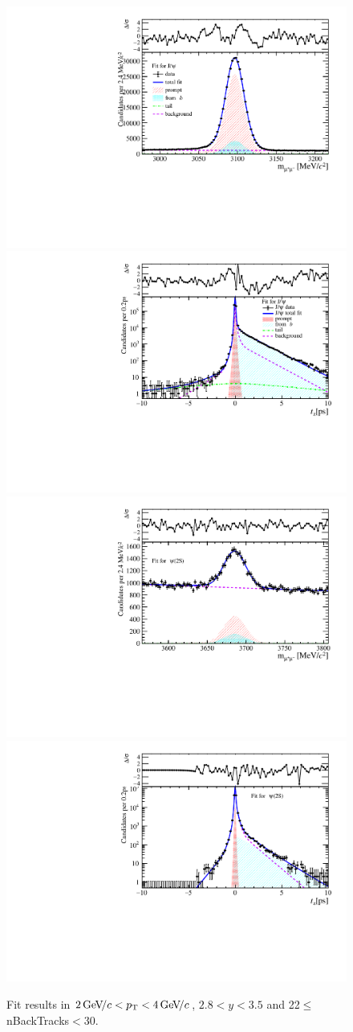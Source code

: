 \begin{figure}[H]
\begin{center}
\includegraphics[width=0.47\linewidth]{pdf/Jpsi/drawmassB/n4y2pt2.pdf}
\includegraphics[width=0.47\linewidth]{pdf/Jpsi/2DFitB/n4y2pt2.pdf}
\vspace*{-0.5cm}
\includegraphics[width=0.47\linewidth]{pdf/Psi2S/drawmassB/n4y2pt2.pdf}
\includegraphics[width=0.47\linewidth]{pdf/Psi2S/2DFitB/n4y2pt2.pdf}
\vspace*{-0.5cm}
\end{center}
\caption{Fit results in $2\text{\,Ge\kern -0.1em V\!/}c<p_{\mathrm{T}}<4\text{\,Ge\kern -0.1em V\!/}c$, $2.8<y<3.5$ and 22$\leq$nBackTracks$<$30.}
\label{Fitn4y2pt2}
\end{figure}
